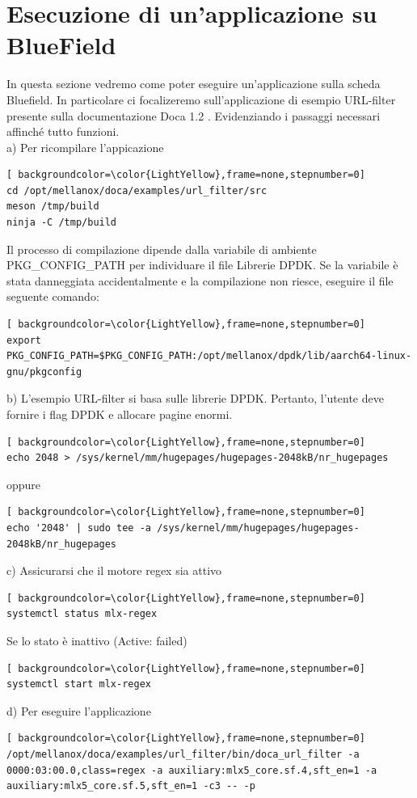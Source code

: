 \documentclass[binding=0.6cm]{sapthesis}
\theoremstyle{definition}
\begin{document}
\section{Esecuzione di un'applicazione su BlueField}

In questa sezione vedremo come poter eseguire un'applicazione sulla scheda Bluefield.
In particolare ci focalizeremo sull'applicazione di esempio URL-filter presente sulla documentazione Doca 1.2 \cite{doca doc url filter}.
Evidenziando i passaggi necessari affinché tutto funzioni.\\
a) Per ricompilare l'appicazione
\begin{lstlisting}[ backgroundcolor=\color{LightYellow},frame=none,stepnumber=0]
cd /opt/mellanox/doca/examples/url_filter/src
meson /tmp/build 
ninja -C /tmp/build
\end{lstlisting}
Il processo di compilazione dipende dalla variabile di ambiente PKG\_CONFIG\_PATH per individuare il file Librerie DPDK. Se la variabile è stata danneggiata accidentalmente e la compilazione non riesce, eseguire il file seguente comando: 
\begin{lstlisting}[ backgroundcolor=\color{LightYellow},frame=none,stepnumber=0]
export PKG_CONFIG_PATH=$PKG_CONFIG_PATH:/opt/mellanox/dpdk/lib/aarch64-linux-gnu/pkgconfig
\end{lstlisting}
b) L'esempio URL-filter si basa sulle librerie DPDK. Pertanto, l'utente deve fornire i flag DPDK e allocare pagine enormi. 
\begin{lstlisting}[ backgroundcolor=\color{LightYellow},frame=none,stepnumber=0]
echo 2048 > /sys/kernel/mm/hugepages/hugepages-2048kB/nr_hugepages
\end{lstlisting}
oppure
\begin{lstlisting}[ backgroundcolor=\color{LightYellow},frame=none,stepnumber=0]
echo '2048' | sudo tee -a /sys/kernel/mm/hugepages/hugepages-2048kB/nr_hugepages
\end{lstlisting}
c) Assicurarsi che il motore regex sia attivo
\begin{lstlisting}[ backgroundcolor=\color{LightYellow},frame=none,stepnumber=0]
systemctl status mlx-regex
\end{lstlisting}
Se lo stato è inattivo (Active: failed)
\begin{lstlisting}[ backgroundcolor=\color{LightYellow},frame=none,stepnumber=0]
systemctl start mlx-regex
\end{lstlisting}
d) Per eseguire l'applicazione
\begin{lstlisting}[ backgroundcolor=\color{LightYellow},frame=none,stepnumber=0]
/opt/mellanox/doca/examples/url_filter/bin/doca_url_filter -a 0000:03:00.0,class=regex -a auxiliary:mlx5_core.sf.4,sft_en=1 -a auxiliary:mlx5_core.sf.5,sft_en=1 -c3 -- -p
\end{lstlisting}
\end{document}
